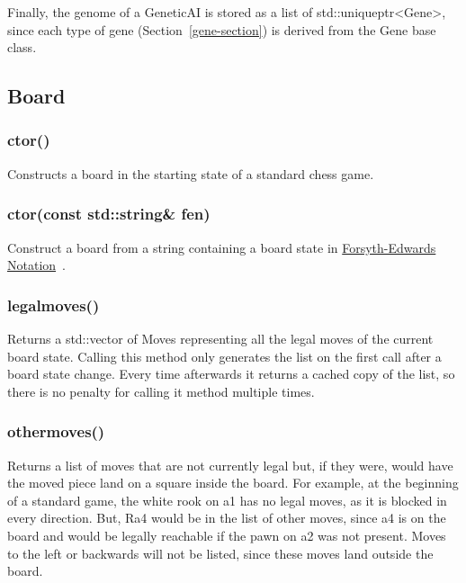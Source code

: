 \documentclass[letterpaper]{article}
\newcommand{\code}[1]{\small\textsf{#1}}
\renewcommand{\_}{\allowbreak\textunderscore\allowbreak}
\begin{document}
Finally, the genome of a \code{Genetic\_AI} is stored as a list of \code{std::unique\_ptr<Gene>}, since each type of gene (Section~\ref{gene-section}) is derived from the \code{Gene} base class.

\subsection{Board}

\subsubsection{ctor()} %

Constructs a board in the starting state of a standard chess game.

\subsubsection[ctor(string)]{ctor(const std::string\& fen)}

Construct a board from a string containing a board state in \href{https://en.wikipedia.org/wiki/Forsyth\%E2\%80\%93Edwards\_Notation}{Forsyth-Edwards Notation}~\cite{fen-notation}.

\subsubsection{legal\_moves()}

Returns a \code{std::vector} of \code{Move}s representing all the legal moves of the current board state. Calling this method only generates the list on the first call after a board state change. Every time afterwards it returns a cached copy of the list, so there is no penalty for calling it method multiple times.

\subsubsection{other\_moves()}

Returns a list of moves that are not currently legal but, if they were, would have the moved piece land on a square inside the board. For example, at the beginning of a standard game, the white rook on a1 has no legal moves, as it is blocked in every direction. But, Ra4 would be in the list of other moves, since a4 is on the board and would be legally reachable if the pawn on a2 was not present. Moves to the left or backwards will not be listed, since these moves land outside the board.
\end{document}
